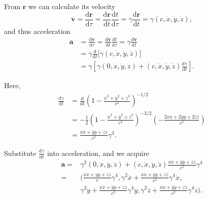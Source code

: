 From \(\boldsymbol{r}\) we can calculate its velocity
\[\boldsymbol{v} = \frac{\mathrm{d} \boldsymbol{r}}{\mathrm{d} \tau} = \frac{\mathrm{d} \boldsymbol{r}}{\mathrm{d}t} \frac{\mathrm{d}t}{\mathrm{d} \tau} = \gamma \frac{\mathrm{d} \boldsymbol{r}}{\mathrm{d}t} = \gamma (c, \dot{x}, \dot{y}, \dot{z}),\]
and thus acceleration \begin{align*}
    \boldsymbol{a} & = \frac{\mathrm{d} \boldsymbol{v}}{\mathrm{d} \tau} = \frac{\mathrm{d} \boldsymbol{v}}{\mathrm{d}t} \frac{\mathrm{d}t}{\mathrm{d} \tau} = \gamma \frac{\mathrm{d} \boldsymbol{v}}{\mathrm{d}t} \\
    & = \gamma \frac{\mathrm{d}}{\mathrm{d}t} \Big[ \gamma \left( c, \dot{x}, \dot{y}, \dot{z} \right) \Big] \\
    & = \gamma \left[ \gamma (0, \ddot{x}, \ddot{y}, \ddot{z}) + \left( c, \dot{x}, \dot{y}, \dot{z} \right) \frac{\mathrm{d} \gamma}{\mathrm{d}t} \right].
\end{align*}

Here, \begin{align*}
    \frac{\mathrm{d} \gamma}{\mathrm{d}t} & = \frac{\mathrm{d}}{\mathrm{d}t} \left( 1 - \frac{\dot{x}^2 + \dot{y}^2 + \dot{z}^2}{c^2} \right)^{- 1/2} \\
    & = - \frac{1}{2} \left( 1 - \frac{\dot{x}^2 + \dot{y}^2 + \dot{z}^2}{c^2} \right)^{- 3/2} \left( - \frac{2 \dot{x} \ddot{x} + 2 \dot{y} \ddot{y} + 2 \dot{z} \ddot{z}}{c^2} \right) \\
    & = \frac{\dot{x} \ddot{x} + \dot{y} \ddot{y} + \dot{z} \ddot{z}}{c^2} \gamma^3.
\end{align*}

Substitute \(\displaystyle \frac{\mathrm{d} \gamma}{\mathrm{d}t}\) into
acceleration, and we acquire \begin{align*}
    \boldsymbol{a} ={} & \gamma^2 (0, \ddot{x}, \ddot{y}, \ddot{z}) + \left( c, \dot{x}, \dot{y}, \dot{z} \right)\frac{\dot{x} \ddot{x} + \dot{y} \ddot{y} + \dot{z} \ddot{z}}{c^2} \gamma^4 \\
    ={} & \biggl(  \frac{\dot{x} \ddot{x} + \dot{y} \ddot{y} + \dot{z} \ddot{z}}{c} \gamma^4, \gamma^2 \ddot{x} + \frac{\dot{x} \ddot{x} + \dot{y} \ddot{y} + \dot{z} \ddot{z}}{c^2} \gamma^4 \dot{x}, \\
    & \gamma^2 \ddot{y} + \frac{\dot{x} \ddot{x} + \dot{y} \ddot{y} + \dot{z} \ddot{z}}{c^2} \gamma^4 \dot{y}, \gamma^2 \ddot{z} + \frac{\dot{x} \ddot{x} + \dot{y} \ddot{y} + \dot{z} \ddot{z}}{c^2} \gamma^4 \dot{z} \biggr).
\end{align*}

